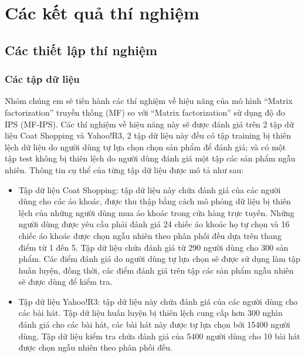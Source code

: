\chapter{Các kết quả thí nghiệm}
\label{Chapter4}


\section{Các thiết lập thí nghiệm}
\label{sec:4_setup}
\subsection{Các tập dữ liệu}
Nhóm chúng em sẽ tiến hành các thí nghiệm về hiệu năng của mô hình ``Matrix factorization'' truyền thống (MF) so với ``Matrix factorization'' sử dụng độ đo IPS (MF-IPS). Các thí nghiệm về hiệu năng này sẽ được đánh giá trên 2 tập dữ liệu Coat Shopping và Yahoo!R3, 2 tập dữ liệu này đều có tập training bị thiên lệch dữ liệu do người dùng tự lựa chọn chọn sản phẩm để đánh giá; và có một tập test không bị thiên lệch do người dùng đánh giá một tập các sản phẩm ngẫu nhiên. Thông tin cụ thể của từng tập dữ liệu được mô tả như sau:
\begin{itemize}
    \item Tập dữ liệu Coat Shopping: tập dữ liệu này chứa đánh giá của các người dùng cho các áo khoác, được thu thập bằng cách mô phỏng dữ liệu bị thiên lệch của những người dùng mua áo khoác trong cửa hàng trực tuyến. Những người dùng được yêu cầu phải đánh giá 24 chiếc áo khoác họ tự chọn và 16 chiếc áo khoác được chọn ngẫu nhiên theo phân phối đều dựa trên thang điểm từ 1 đến 5. Tập dữ liệu chứa đánh giá từ 290 người dùng cho 300 sản phẩm. Các điểm đánh giá do người dùng tự lựa chọn sẽ được sử dụng làm tập huấn luyện, đồng thời, các điểm đánh giá trên tập các sản phẩm ngẫu nhiên sẽ được dùng để kiểm tra. 
    \item Tập dữ liệu Yahoo!R3: tập dữ liệu này chứa đánh giá của các người dùng cho các bài hát. Tập dữ liệu huấn luyện bị thiên lệch cung cấp hơn 300 nghìn đánh giá cho các bài hát, các bài hát này được tự lựa chọn bởi 15400 người dùng. Tập dữ liệu kiểm tra chứa đánh giá của 5400 người dùng cho 10 bài hát được chọn ngẫu nhiên theo phân phối đều.
\end{itemize}

